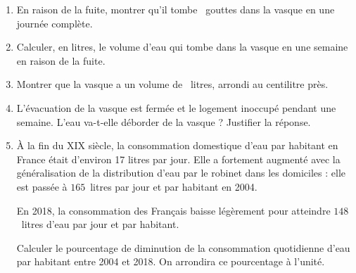 \documentclass[exercice,a4]{thedocument}%
\begin{document}
\begin{enumerate}
\item En raison de la fuite, montrer qu'il tombe ~gouttes dans la vasque en une journée complète.

\item Calculer, en litres, le volume d'eau qui tombe dans la vasque en une semaine en raison de la fuite.

\item  Montrer que la vasque  a un volume de ~litres, arrondi au centilitre près.

\item L'évacuation de la vasque est fermée et le logement inoccupé pendant une semaine. L'eau va-t-elle déborder de la vasque ? Justifier la réponse.
\item  À la fin du XIX\ieme{} siècle, la consommation domestique d'eau par habitant en France était d'environ 17 litres par jour. Elle a fortement augmenté avec la généralisation de la distribution d'eau par le robinet dans les domiciles : elle est passée à $165$~litres par jour et par habitant en 2004.

En 2018, la consommation des Français baisse légèrement pour atteindre $148$~litres d'eau par jour et par habitant.

Calculer le pourcentage de diminution de la consommation quotidienne d'eau par habitant entre 2004 et 2018. On arrondira ce pourcentage à l'unité.
\end{enumerate}

\showthesource
\end{document}
